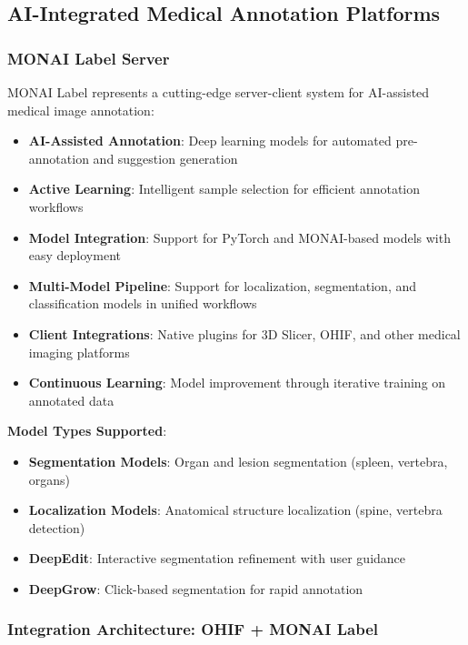 \subsection{AI-Integrated Medical Annotation Platforms}

\subsubsection{MONAI Label Server}

MONAI Label \cite{monai2023} represents a cutting-edge server-client system for AI-assisted medical image annotation:

\begin{itemize}
    \item \textbf{AI-Assisted Annotation}: Deep learning models for automated pre-annotation and suggestion generation
    \item \textbf{Active Learning}: Intelligent sample selection for efficient annotation workflows
    \item \textbf{Model Integration}: Support for PyTorch and MONAI-based models with easy deployment
    \item \textbf{Multi-Model Pipeline}: Support for localization, segmentation, and classification models in unified workflows
    \item \textbf{Client Integrations}: Native plugins for 3D Slicer, OHIF, and other medical imaging platforms
    \item \textbf{Continuous Learning}: Model improvement through iterative training on annotated data
\end{itemize}

\textbf{Model Types Supported}:
\begin{itemize}
    \item \textbf{Segmentation Models}: Organ and lesion segmentation (spleen, vertebra, organs)
    \item \textbf{Localization Models}: Anatomical structure localization (spine, vertebra detection)
    \item \textbf{DeepEdit}: Interactive segmentation refinement with user guidance
    \item \textbf{DeepGrow}: Click-based segmentation for rapid annotation
\end{itemize}

\subsubsection{Integration Architecture: OHIF + MONAI Label}

